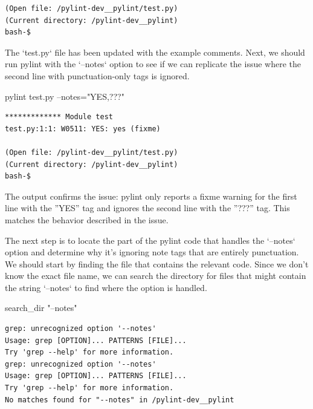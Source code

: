 {\begin{observationbox}
\begin{Verbatim}[breaklines=true, breakanywhere=true]
(Open file: /pylint-dev__pylint/test.py)
(Current directory: /pylint-dev__pylint)
bash-$
\end{Verbatim}
\end{observationbox}
\begin{agentbox}
The `test.py` file has been updated with the example comments. Next, we should run pylint with the `--notes` option to see if we can replicate the issue where the second line with punctuation-only tags is ignored.



\hrulefill
\begin{CodeVerbatim}[breaklines=true, breakanywhere=true]
pylint test.py --notes="YES,???"
\end{CodeVerbatim}
\end{agentbox}
\begin{observationbox}\begin{Verbatim}[breaklines=true, breakanywhere=true]
************* Module test
test.py:1:1: W0511: YES: yes (fixme)

(Open file: /pylint-dev__pylint/test.py)
(Current directory: /pylint-dev__pylint)
bash-$
\end{Verbatim}
\end{observationbox}
\begin{agentbox}
The output confirms the issue: pylint only reports a fixme warning for the first line with the ''YES'' tag and ignores the second line with the ''???'' tag. This matches the behavior described in the issue.



The next step is to locate the part of the pylint code that handles the `--notes` option and determine why it's ignoring note tags that are entirely punctuation. We should start by finding the file that contains the relevant code. Since we don't know the exact file name, we can search the directory for files that might contain the string `--notes` to find where the option is handled.



\hrulefill
\begin{CodeVerbatim}[breaklines=true, breakanywhere=true]
search_dir "--notes"
\end{CodeVerbatim}
\end{agentbox}
\begin{observationbox}\begin{Verbatim}[breaklines=true, breakanywhere=true]
grep: unrecognized option '--notes'
Usage: grep [OPTION]... PATTERNS [FILE]...
Try 'grep --help' for more information.
grep: unrecognized option '--notes'
Usage: grep [OPTION]... PATTERNS [FILE]...
Try 'grep --help' for more information.
No matches found for "--notes" in /pylint-dev__pylint


\end{Verbatim}
\end{observationbox}}
